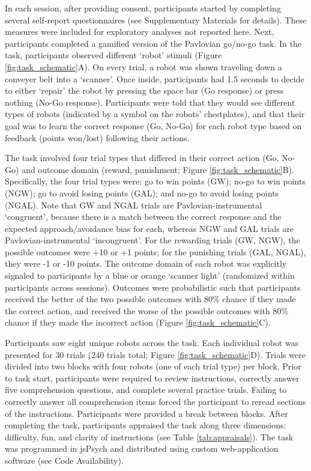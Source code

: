 \documentclass[a4paper,12pt]{article}
\begin{document}
\begin{refsection}[main]
In each session, after providing consent, participants started by completing several self-report questionnaires (see Supplementary Materials for details). These measures were included for exploratory analyses not reported here. Next, participants completed a gamified version of the Pavlovian go/no-go task. In the task, participants observed different `robot' stimuli (Figure \ref{fig:task_schematic}A). On every trial, a robot was shown traveling down a conveyer belt into a `scanner'. Once inside, participants had 1.5 seconds to decide to either `repair' the robot by pressing the space bar (Go response) or press nothing (No-Go response). Participants were told that they would see different types of robots (indicated by a symbol on the robots' chestplates), and that their goal was to learn the correct response (Go, No-Go) for each robot type based on feedback (points won/lost) following their actions.

The task involved four trial types that differed in their correct action (Go, No-Go) and outcome domain (reward, punishment; Figure \ref{fig:task_schematic}B). Specifically, the four trial types were: go to win points (GW); no-go to win points (NGW); go to avoid losing points (GAL); and no-go to avoid losing points (NGAL). Note that GW and NGAL trials are Pavlovian-instrumental `congruent', because there is a match between the correct response and the expected approach/avoidance bias for each, whereas NGW and GAL trials are Pavlovian-instrumental `incongruent'. For the rewarding trials (GW, NGW), the possible outcomes were +10 or +1 points; for the punishing trials (GAL, NGAL), they were -1 or -10 points. The outcome domain of each robot was explicitly signaled to participants by a blue or orange `scanner light' (randomized within participants across sessions). Outcomes were probabilistic such that participants received the better of the two possible outcomes with 80\% chance if they made the correct action, and received the worse of the possible outcomes with 80\% chance if they made the incorrect action (Figure \ref{fig:task_schematic}C).

Participants saw eight unique robots across the task. Each individual robot was presented for 30 trials (240 trials total; Figure \ref{fig:task_schematic}D). Trials were divided into two blocks with four robots (one of each trial type) per block. Prior to task start, participants were required to review instructions, correctly answer five comprehension questions, and complete several practice trials. Failing to correctly answer all comprehension items forced the participant to reread sections of the instructions. Participants were provided a break between blocks. After completing the task, participants appraised the task along three dimensions: difficulty, fun, and clarity of instructions (see Table \ref{tab:appraisals}). The task was programmed in jsPsych \cite{de2015jspsych} and distributed using custom web-application software (see Code Availability). 


\end{refsection}
\end{document}
